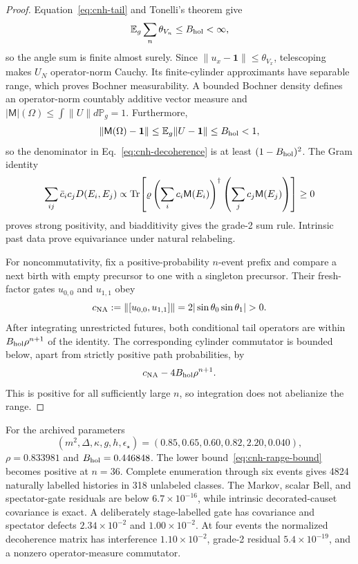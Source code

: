 \begin{proof}
Equation~\eqref{eq:cnh-tail} and Tonelli's theorem give
\[
 \mathbb E_g\sum_n\theta_{V_n}\le B_{\rm hol}<\infty,
\]
so the angle sum is finite almost surely.  Since
\(\|u_x-\mathbf1\|\le\theta_{V_x}\), telescoping makes \(U_N\)
operator-norm Cauchy.  Its finite-cylinder approximants have separable
range, which proves Bochner measurability.  A bounded Bochner density
defines an operator-norm countably additive vector measure and
\(|\mathsf M|(\Omega)\le\int\|U\|d\mathbb P_g=1\).  Furthermore,
\[
 \|\mathsf M(\Omega)-\mathbf1\|
 \le\mathbb E_g\|U-\mathbf1\|
 \le B_{\rm hol}<1,
\]
so the denominator in Eq.~\eqref{eq:cnh-decoherence} is at least
\((1-B_{\rm hol})^2\).  The Gram identity
\[
 \sum_{ij}\bar c_i c_jD(E_i,E_j)
 \propto
 \operatorname{Tr}\!\left[
 \varrho\left(\sum_i c_i\mathsf M(E_i)\right)^\dagger
 \left(\sum_j c_j\mathsf M(E_j)\right)
 \right]\ge0
\]
proves strong positivity, and biadditivity gives the grade-2 sum rule.
Intrinsic past data prove equivariance under natural relabeling.

For noncommutativity, fix a positive-probability \(n\)-event prefix and
compare a next birth with empty precursor to one with a singleton precursor.
Their fresh-factor gates \(u_{0,0}\) and \(u_{1,1}\) obey
\[
 c_{\rm NA}:=\|[u_{0,0},u_{1,1}]\|
 =2|\sin\theta_0\sin\theta_1|>0.
\]
After integrating unrestricted futures, both conditional tail operators
are within \(B_{\rm hol}\rho^{n+1}\) of the identity.  The corresponding
cylinder commutator is bounded below, apart from strictly positive path
probabilities, by
\begin{equation}
 c_{\rm NA}-4B_{\rm hol}\rho^{n+1}.
 \label{eq:cnh-range-bound}
\end{equation}
This is positive for all sufficiently large \(n\), so integration does not
abelianize the range.
\end{proof}

For the archived parameters
\[
 (m^2,\Delta,\kappa,g,h,\epsilon_\star)
 =(0.85,0.65,0.60,0.82,2.20,0.040),
\]
\(\rho=0.833981\) and \(B_{\rm hol}=0.446848\).
The lower bound~\eqref{eq:cnh-range-bound} becomes positive at \(n=36\).
Complete enumeration through six events gives 4824 naturally labelled
histories in 318 unlabeled classes.  The Markov, scalar Bell, and
spectator-gate residuals are below \(6.7\times10^{-16}\), while intrinsic
decorated-causet covariance is exact.  A deliberately stage-labelled gate
has covariance and spectator defects \(2.34\times10^{-2}\) and
\(1.00\times10^{-2}\).  At four events the normalized decoherence matrix
has interference \(1.10\times10^{-2}\), grade-2 residual
\(5.4\times10^{-19}\), and a nonzero operator-measure commutator.

